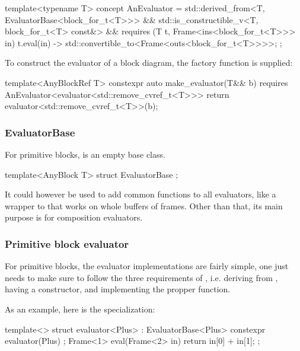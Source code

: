 \begin{cppcodenl}
  template<typename T>
  concept AnEvaluator = 
    std::derived_from<T, EvaluatorBase<block_for_t<T>>>
    && std::is_constructible_v<T, block_for_t<T> const&>
    && requires (T t, Frame<ins<block_for_t<T>>> in) {
      { t.eval(in) } -> std::convertible_to<Frame<outs<block_for_t<T>>>>;
    };
\end{cppcodenl}

To construct the evaluator of a block diagram, the factory function  is supplied:

\begin{cppcodenl}
  template<AnyBlockRef T>
  constexpr auto make_evaluator(T&& b)
  requires AnEvaluator<evaluator<std::remove_cvref_t<T>>>
  {
    return evaluator<std::remove_cvref_t<T>>(b);
  }
\end{cppcodenl}

\subsubsection{EvaluatorBase}

For primitive blocks,  is an empty base class.

\begin{cppcodenl}
  template<AnyBlock T>
  struct EvaluatorBase {};
\end{cppcodenl}

It could however be used to add common functions to all evaluators, like a wrapper to 
that works on whole buffers of frames. Other than that, its main purpose is for composition evaluators.

\subsubsection{Primitive block evaluator}
For primitive blocks, the evaluator implementations are fairly simple, one just needs to make sure to follow
the three requirements of , i.e. deriving from
, having a  constructor, and implementing the propper 
function.

As an example, here is the  specialization:

\begin{cppcodenl}
  template<>
  struct evaluator<Plus> : EvaluatorBase<Plus> {
    constexpr evaluator(Plus) {};
    Frame<1> eval(Frame<2> in)
    {
      return {in[0] + in[1]};
    }
  };
\end{cppcodenl}

